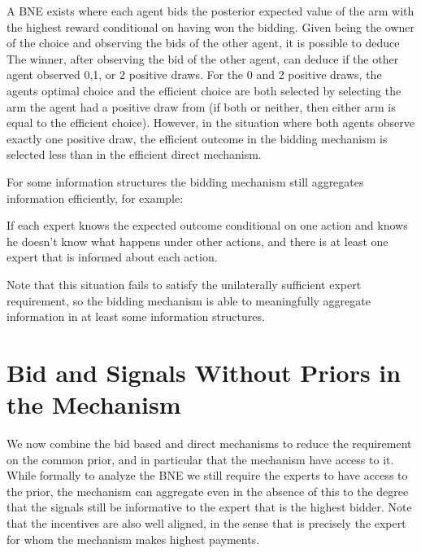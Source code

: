 A BNE exists where each agent bids the posterior expected value of the arm with the highest reward conditional on having won the bidding.
Given being the owner of the choice and observing the bids of the other agent, it is possible to deduce 
The winner, after observing the bid of the other agent, can deduce if the other agent observed 0,1, or 2 positive draws. For the 0 and 2 positive draws, the agents optimal choice and the efficient choice are both selected by selecting the arm the agent had a positive draw from (if both or neither, then either arm is equal to the efficient choice). 
However, in the situation where both agents observe exactly one positive draw, the efficient outcome in the bidding mechanism is selected less than in the efficient direct mechanism.


For some information structures the bidding mechanism still aggregates information efficiently, for example:

\begin{defn}
	If each expert knows the expected outcome conditional on one action and knows he doesn't know what happens under other actions, and there is at least one expert that is informed about each action.
\end{defn}

Note that this situation fails to satisfy the unilaterally sufficient expert requirement, so the bidding mechanism is able to meaningfully aggregate information in at least some information structures. 





\section{Bid and Signals Without Priors in the Mechanism}

We now combine the bid based and direct mechanisms to reduce the requirement on the common prior, and in particular that the mechanism have access to it. 
While formally to analyze the BNE we still require the experts to have access to the prior, the mechanism can aggregate even in the absence of this to the degree that the signals still be informative to the expert that is the highest bidder.
Note that the incentives are also well aligned, in the sense that is precisely the expert for whom the mechanism makes highest payments. 

